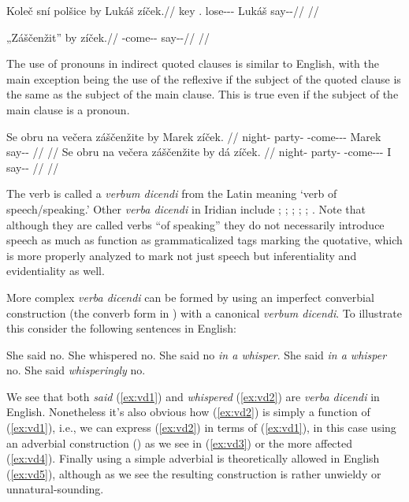 \pex
  \begingl
    \gla Koleč sní polšice by Lukáš zíček.//
    \glb key \Refl{}.\Acc{} lose-\Av{}-\Pf{}-\Cnj{} \Quot{} Lukáš say-\Av{}-\Pf{}//
    \glft {}//
  \endgl
\xe

\pex
  \begingl
    \gla „Záščenžit” by zíček.//
    \glb \First{}\Sg{} \Neg{}-come-\Av{}-\SupP{} \Quot{} say-\Av{}-\Pf{}//
    \glft {}//
  \endgl
\xe

The use of pronouns in indirect quoted clauses is similar to English, with the
main exception being the use of the reflexive  if the subject of the
quoted clause is the same as the subject of the main clause. This is true even
if the subject of the main clause is a pronoun.

\pex
  \begingl
    \gla Se obru na večera záščenžite by Marek zíček. //
    \glb \Refl{} night-\Ins{} \Loc{} party-\Acc{} \Neg{}-come-\Av{}-\SupP{}-\Cnj{} \Quot{} Marek say-\Av{}-\Pf{} //
    \glft {}//
  \endgl
  \begingl
  \gla Se obru na večera záščenžite by dá zíček. //
  \glb \Refl{} night-\Ins{} \Loc{} party-\Acc{} \Neg{}-come-\Av{}-\SupP{}-\Cnj{} \Quot{} I say-\Av{}-\Pf{} //
  \glft {}//
\endgl
\xe

The verb  is called a \emph{verbum dicendi} from the Latin meaning `verb of speech/speaking.' Other \emph{verba
dicendi} in Iridian include ; ;
; ; ;
. Note that although they are called
verbs ``of speaking'' they do not necessarily introduce speech as much as
function as grammaticalized tags marking the quotative,  which is more properly
analyzed to mark not just speech but inferentiality and evidentiality as well.

More complex \emph{verba dicendi} can be formed by using an imperfect converbial
construction (the converb form in ) with a canonical \emph{verbum
dicendi}. To illustrate this consider the following sentences in English:

\pex[*=?*,interpartskip=0pt]
\a\label{ex:vd1} She said no.
\a\label{ex:vd2} She whispered no.
\a\label{ex:vd3} She said no \emph{in a whisper}.
\a\label{ex:vd4}  She said \emph{in a whisper} no.
\a\label{ex:vd5}  She said \emph{whisperingly} no.
\xe

We see that both \emph{said} (\ref{ex:vd1}) and \emph{whispered} (\ref{ex:vd2})
are \emph{verba dicendi} in English. Nonetheless it's also obvious how
(\ref{ex:vd2}) is simply a function of (\ref{ex:vd1}), i.e., we can express
(\ref{ex:vd2}) in terms of (\ref{ex:vd1}), in this case using an adverbial
construction () as we see in (\ref{ex:vd3}) or the more
affected (\ref{ex:vd4}). Finally using a simple adverbial is theoretically allowed
in English (\ref{ex:vd5}), although as we see the resulting construction is
rather unwieldy or unnatural-sounding.

